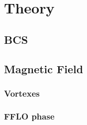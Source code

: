 \section{Theory}

\subsection{BCS}

\subsection{Magnetic Field}

\subsubsection{Vortexes}

\subsubsection{FFLO phase}

